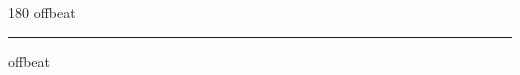 
\begin{frame}
\begin{center}
\begin{turn}{180}
{\fontsize{2.5cm}{1em}\selectfont offbeat}
\end{turn}
\vspace{1em}\par  
\hrule
\vspace{1em}\par  
{\fontsize{2.5cm}{1em}\selectfont offbeat}
\end{center}
\end{frame}

